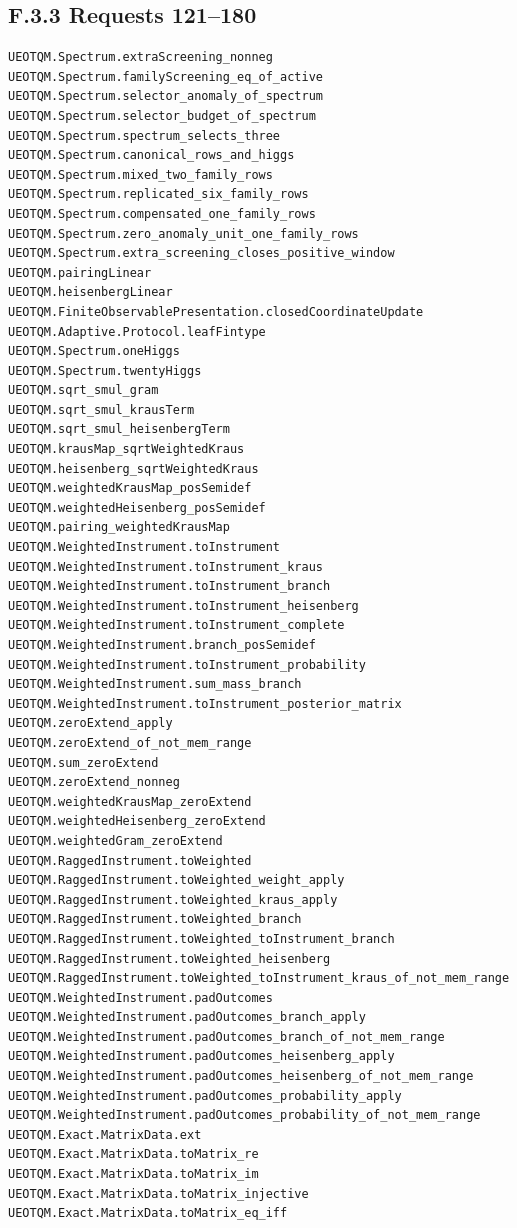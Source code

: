 \documentclass[
  11pt,
  oneside]{book}
\begin{document}
\subsection{F.3.3 Requests 121--180}

\begin{Verbatim}[breaklines,breakanywhere,fontsize=\scriptsize]
UEOTQM.Spectrum.extraScreening_nonneg
UEOTQM.Spectrum.familyScreening_eq_of_active
UEOTQM.Spectrum.selector_anomaly_of_spectrum
UEOTQM.Spectrum.selector_budget_of_spectrum
UEOTQM.Spectrum.spectrum_selects_three
UEOTQM.Spectrum.canonical_rows_and_higgs
UEOTQM.Spectrum.mixed_two_family_rows
UEOTQM.Spectrum.replicated_six_family_rows
UEOTQM.Spectrum.compensated_one_family_rows
UEOTQM.Spectrum.zero_anomaly_unit_one_family_rows
UEOTQM.Spectrum.extra_screening_closes_positive_window
UEOTQM.pairingLinear
UEOTQM.heisenbergLinear
UEOTQM.FiniteObservablePresentation.closedCoordinateUpdate
UEOTQM.Adaptive.Protocol.leafFintype
UEOTQM.Spectrum.oneHiggs
UEOTQM.Spectrum.twentyHiggs
UEOTQM.sqrt_smul_gram
UEOTQM.sqrt_smul_krausTerm
UEOTQM.sqrt_smul_heisenbergTerm
UEOTQM.krausMap_sqrtWeightedKraus
UEOTQM.heisenberg_sqrtWeightedKraus
UEOTQM.weightedKrausMap_posSemidef
UEOTQM.weightedHeisenberg_posSemidef
UEOTQM.pairing_weightedKrausMap
UEOTQM.WeightedInstrument.toInstrument
UEOTQM.WeightedInstrument.toInstrument_kraus
UEOTQM.WeightedInstrument.toInstrument_branch
UEOTQM.WeightedInstrument.toInstrument_heisenberg
UEOTQM.WeightedInstrument.toInstrument_complete
UEOTQM.WeightedInstrument.branch_posSemidef
UEOTQM.WeightedInstrument.toInstrument_probability
UEOTQM.WeightedInstrument.sum_mass_branch
UEOTQM.WeightedInstrument.toInstrument_posterior_matrix
UEOTQM.zeroExtend_apply
UEOTQM.zeroExtend_of_not_mem_range
UEOTQM.sum_zeroExtend
UEOTQM.zeroExtend_nonneg
UEOTQM.weightedKrausMap_zeroExtend
UEOTQM.weightedHeisenberg_zeroExtend
UEOTQM.weightedGram_zeroExtend
UEOTQM.RaggedInstrument.toWeighted
UEOTQM.RaggedInstrument.toWeighted_weight_apply
UEOTQM.RaggedInstrument.toWeighted_kraus_apply
UEOTQM.RaggedInstrument.toWeighted_branch
UEOTQM.RaggedInstrument.toWeighted_toInstrument_branch
UEOTQM.RaggedInstrument.toWeighted_heisenberg
UEOTQM.RaggedInstrument.toWeighted_toInstrument_kraus_of_not_mem_range
UEOTQM.WeightedInstrument.padOutcomes
UEOTQM.WeightedInstrument.padOutcomes_branch_apply
UEOTQM.WeightedInstrument.padOutcomes_branch_of_not_mem_range
UEOTQM.WeightedInstrument.padOutcomes_heisenberg_apply
UEOTQM.WeightedInstrument.padOutcomes_heisenberg_of_not_mem_range
UEOTQM.WeightedInstrument.padOutcomes_probability_apply
UEOTQM.WeightedInstrument.padOutcomes_probability_of_not_mem_range
UEOTQM.Exact.MatrixData.ext
UEOTQM.Exact.MatrixData.toMatrix_re
UEOTQM.Exact.MatrixData.toMatrix_im
UEOTQM.Exact.MatrixData.toMatrix_injective
UEOTQM.Exact.MatrixData.toMatrix_eq_iff
\end{Verbatim}
\end{document}
